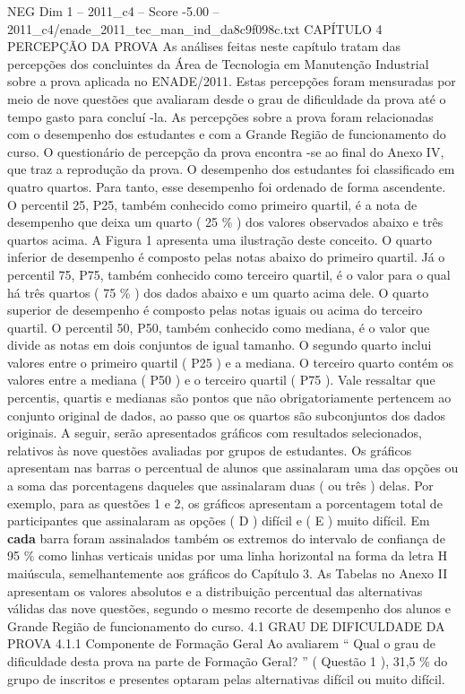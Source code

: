 \begin{textsample}{NEG Dim 1 – 2011\_c4 – Score -5.00 – 2011\_c4/enade\_2011\_tec\_man\_ind\_da8c9f098c.txt}  \label{ex:f1_neg_111}
CAPÍTULO 4 PERCEPÇÃO DA PROVA As análises feitas neste capítulo tratam das percepções dos concluintes da Área de Tecnologia em Manutenção Industrial sobre a prova aplicada no ENADE/2011.
Estas percepções foram mensuradas por meio de nove questões que avaliaram desde o grau de dificuldade da prova até o tempo gasto para concluí -la.
As percepções sobre a prova foram relacionadas com o desempenho dos estudantes e com a Grande Região de funcionamento do curso.
O questionário de percepção da prova encontra -se ao final do Anexo IV, que traz a reprodução da prova.
O desempenho dos estudantes foi classificado em quatro quartos.
Para tanto, esse desempenho foi ordenado de forma ascendente.
O percentil 25, P25, também conhecido como primeiro quartil, é a nota de desempenho que deixa um quarto ( 25 \% ) dos valores observados abaixo e três quartos acima.
A Figura 1 apresenta uma ilustração deste conceito.
O quarto inferior de desempenho é composto pelas notas abaixo do primeiro quartil.
Já o percentil 75, P75, também conhecido como terceiro quartil, é o valor para o qual há três quartos ( 75 \% ) dos dados abaixo e um quarto acima dele.
O quarto superior de desempenho é composto pelas notas iguais ou acima do terceiro quartil.
O percentil 50, P50, também conhecido como mediana, é o valor que divide as notas em dois conjuntos de igual tamanho.
O segundo quarto inclui valores entre o primeiro quartil ( P25 ) e a mediana.
O terceiro quarto contém os valores entre a mediana ( P50 ) e o terceiro quartil ( P75 ).
Vale ressaltar que percentis, quartis e medianas são pontos que não obrigatoriamente pertencem ao conjunto original de dados, ao passo que os quartos são subconjuntos dos dados originais.
A seguir, serão apresentados gráficos com resultados selecionados, relativos às nove questões avaliadas por grupos de estudantes.
Os gráficos apresentam nas barras o percentual de alunos que assinalaram uma das opções ou a soma das porcentagens daqueles que assinalaram duas ( ou três ) delas.
Por exemplo, para as questões 1 e 2, os gráficos apresentam a porcentagem total de participantes que assinalaram as opções ( D ) difícil e ( E ) muito difícil.
Em \textbf{cada} barra foram assinalados também os extremos do intervalo de confiança de 95 \% como linhas verticais unidas por uma linha horizontal na forma da letra H maiúscula, semelhantemente aos gráficos do Capítulo 3.
As Tabelas no Anexo II apresentam os valores absolutos e a distribuição percentual das alternativas válidas das nove questões, segundo o mesmo recorte de desempenho dos alunos e Grande Região de funcionamento do curso. 4.1 GRAU DE DIFICULDADE DA PROVA 4.1.1 Componente de Formação Geral Ao avaliarem “ Qual o grau de dificuldade desta prova na parte de Formação Geral? ” ( Questão 1 ), 31,5 \% do grupo de inscritos e presentes optaram pelas alternativas difícil ou muito difícil.

\end{textsample}
